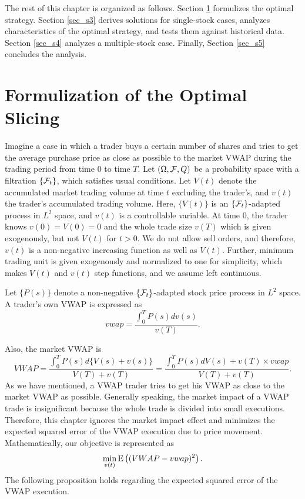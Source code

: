 The rest of this chapter is organized as follows.  Section \ref{sec_s2} formulizes the optimal strategy.  Section \ref{sec_s3} derives solutions for single-stock cases, analyzes characteristics of the optimal strategy, and tests them against historical data.  Section \ref{sec_s4} analyzes a multiple-stock case.  Finally, Section \ref{sec_s5} concludes the analysis.

\section{Formulization of the Optimal Slicing}\label{sec_s2}
Imagine a case in which a trader buys a certain number of shares and
tries to get the average purchase price as close as possible to the
market VWAP during the trading period from time 0 to time $T$.    Let
$(\Omega, {\cal F}, Q)$ be a probability space with a filtration
$\{ {\cal F}_t \}$, which satisfies usual conditions.  Let $V(t)$
denote the accumulated market trading volume at time $t$ excluding the
trader's, and $v(t)$ the trader's accumulated trading volume.
 Here, $\{ V(t) \}$ is an $\{ {\cal F}_t \}$-adapted process in $L^2$ space, and $v(t)$ is a controllable variable.  At time 0, the trader knows $v(0)=V(0)=0$ and the whole trade size $v(T)$ which is given exogenously, but not $V(t)$ for $t>0$.  We do not allow sell orders, and therefore, $v(t)$ is a non-negative increasing function as well as $V(t)$.  Further, minimum trading unit is given exogenously and normalized to one for simplicity, which makes $V(t)$ and $v(t)$ step functions, and we assume left continuous. 

Let $\{ P(s) \}$ denote a non-negative $\{ {\cal F}_t \}$-adapted stock price process in $L^2$ space.  A trader's own VWAP is expressed as
\[
  vwap=\frac{\int_0^T P(s) dv(s)}{v(T)}.
\]

Also, the market VWAP is 
\[
  VWAP=\frac{\int_0^T P(s)d\{V(s)+v(s)\}}{V(T)+v(T)}=\frac{\int_0^T P(s)dV(s)+v(T) \times vwap}{V(T)+v(T)}.
\]
As we have mentioned, a VWAP trader tries to get his VWAP as close to the market VWAP as possible.  Generally speaking, the market impact of a VWAP trade is insignificant because the whole trade is divided into small executions.  Therefore, this chapter ignores the market impact effect and minimizes the expected squared error of the VWAP execution due to price movement.  Mathematically, our objective is represented as
\[
  \min_{v(t)} {\mathrm{E}}\left( (VWAP-vwap)^2 \right).
\]
The following proposition holds regarding the expected squared error of the VWAP execution.

